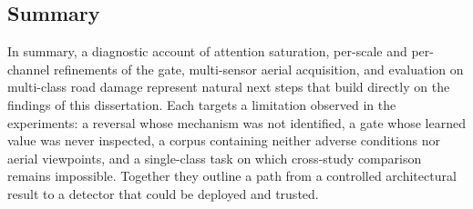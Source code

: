 \documentclass[MScCS]{uccthesis}
\begin{document}
\subsection{Summary}

In summary, a diagnostic account of attention saturation,
per-scale and per-channel refinements of the gate, multi-sensor aerial acquisition,
and evaluation on multi-class road damage represent natural next steps that build
directly on the findings of this dissertation. Each targets a limitation observed in
the experiments: a reversal whose mechanism was not identified, a gate whose learned value was never inspected, a
corpus containing neither adverse conditions nor aerial viewpoints, and a
single-class task on which cross-study comparison remains impossible. Together they
outline a path from a controlled architectural result to a detector that could be
deployed and trusted.

\backmatter
   \printbibliography
\end{document}
